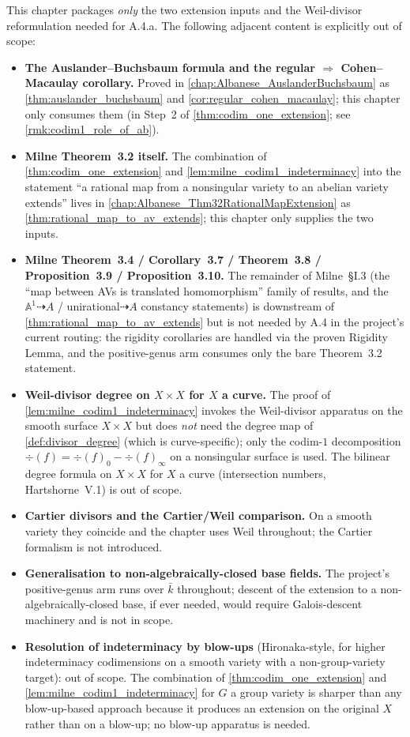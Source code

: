 This chapter packages \emph{only} the two extension inputs and the Weil-divisor
reformulation needed for A.4.a. The following adjacent content is explicitly out of
scope:
\begin{itemize}
  \item \textbf{The Auslander--Buchsbaum formula and the regular \(\Rightarrow\)
    Cohen--Macaulay corollary.} Proved in \cref{chap:Albanese_AuslanderBuchsbaum}
    as \cref{thm:auslander_buchsbaum} and \cref{cor:regular_cohen_macaulay}; this
    chapter only consumes them (in Step~2 of \cref{thm:codim_one_extension}; see
    \cref{rmk:codim1_role_of_ab}).
  \item \textbf{Milne Theorem~3.2 itself.} The combination of
    \cref{thm:codim_one_extension} and \cref{lem:milne_codim1_indeterminacy} into the
    statement ``a rational map from a nonsingular variety to an abelian variety
    extends'' lives in \cref{chap:Albanese_Thm32RationalMapExtension} as
    \cref{thm:rational_map_to_av_extends}; this chapter only supplies the two inputs.
  \item \textbf{Milne Theorem~3.4 / Corollary~3.7 / Theorem~3.8 / Proposition~3.9 /
    Proposition~3.10.} The remainder of Milne~\S I.3 (the ``map between AVs is
    translated homomorphism'' family of results, and the
    \(\mathbb A^1 \dashrightarrow A\) / unirational\(\dashrightarrow A\) constancy
    statements) is downstream of \cref{thm:rational_map_to_av_extends} but is not
    needed by A.4 in the project's current routing: the rigidity corollaries are
    handled via the proven Rigidity Lemma, and the positive-genus arm consumes only
    the bare Theorem~3.2 statement.
  \item \textbf{Weil-divisor degree on \(X \times X\) for \(X\) a curve.} The proof of
    \cref{lem:milne_codim1_indeterminacy} invokes the Weil-divisor apparatus on the
    smooth surface \(X \times X\) but does \emph{not} need the degree map of
    \cref{def:divisor_degree} (which is curve-specific); only the codim-\(1\)
    decomposition \(\div(f) = \div(f)_0 - \div(f)_\infty\) on a nonsingular surface is
    used. The bilinear degree formula on \(X \times X\) for \(X\) a curve (intersection
    numbers, Hartshorne~V.1) is out of scope.
  \item \textbf{Cartier divisors and the Cartier/Weil comparison.} On a smooth variety
    they coincide and the chapter uses Weil throughout; the Cartier formalism is not
    introduced.
  \item \textbf{Generalisation to non-algebraically-closed base fields.} The
    project's positive-genus arm runs over \(\bar k\) throughout; descent of the
    extension to a non-algebraically-closed base, if ever needed, would require
    Galois-descent machinery and is not in scope.
  \item \textbf{Resolution of indeterminacy by blow-ups} (Hironaka-style, for higher
    indeterminacy codimensions on a smooth variety with a non-group-variety target):
    out of scope. The combination of \cref{thm:codim_one_extension} and
    \cref{lem:milne_codim1_indeterminacy} for \(G\) a group variety is sharper than any
    blow-up-based approach because it produces an extension on the original \(X\)
    rather than on a blow-up; no blow-up apparatus is needed.
\end{itemize}
